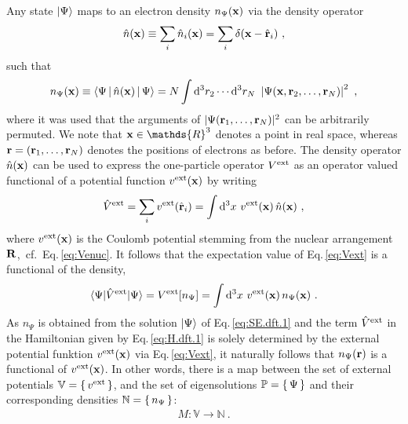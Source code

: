 Any state $\Ket{\Psi}$ maps to an electron density $n_\Psi ({\bf x})$ via the density operator
\begin{align}
	\hat n ({\bf x}) \equiv \sum_i \hat n_i ({\bf x}) = \sum_i \delta ({\bf x} - \hat{\bf r}_i)~,
	\label{eq:densop}
\end{align}
such that
\begin{align}
	n_\Psi({\bf x}) 
	\equiv \Braket{\Psi | \hat n({\bf x}) | \Psi} 
	= N \int {\rm d}^3 r_2 \cdots {\rm d}^3 r_{N} ~ 
	\left\lvert 
	\Psi ({\bf x}, {\bf r}_2, \ldots, {\bf r}_N) 
	\right\rvert^2~,
\end{align}
where it was used that the arguments of $\lvert \Psi ({\bf r}_1, \ldots, {\bf r}_N) \rvert^2$ can be arbitrarily permuted.
We note that ${\bf x} \in \mathds{R}^3$ denotes a point in real space, whereas ${\bf r} = ({\bf r}_1, \ldots, {\bf r}_N)$ denotes the positions of electrons as before.
The density operator $\hat n ({\bf x})$ can be used to express the one-particle operator $V^{\rm ext}$ as an operator valued functional of a potential function $v^{\rm ext} ({\bf x})$ by writing
\begin{align}
	\hat V^{\rm ext}
		= \sum_i v^{\rm ext} (\hat{\bf r}_i)
		= \int {\rm d}^3 x ~ v^{\rm ext} ({\bf x}) \, \hat n ({\bf x})~,
		\label{eq:Vext}
\end{align}
where $v^{\rm ext} ({\bf x})$ is the Coulomb potential stemming from the nuclear arrangement $\bf R$,~cf.~Eq.\,\eqref{eq:Venuc}.
It follows that the expectation value of Eq.\,\eqref{eq:Vext} is a functional of the density,
\begin{align}
	\braket{\Psi | \hat V^{\rm ext} | \Psi}
		= V^{\rm ext} [n_\Psi]
		= \int {\rm d}^3 x ~ v^{\rm ext} ({\bf x}) \, n_\Psi ({\bf x})~.
		\label{eq:dft.Vext.expectation}
\end{align}
As $n_\Psi$ is obtained from the solution $\Ket{\Psi}$ of Eq.\,\eqref{eq:SE.dft.1} and the term $\hat V^{\rm ext}$ in the Hamiltonian given by Eq.\,\eqref{eq:H.dft.1} is solely determined by the external potential funktion $v^{\rm ext} ({\bf x})$ via Eq.\,\eqref{eq:Vext}, it naturally follows that $n_\Psi ({\bf r})$ is a functional of $v^{\rm ext} ({\bf x})$. In other words, there is a map between the set of external potentials $\mathbb V = \set{v^{\rm ext}}$, and the set of eigensolutions $\mathbb P = \set{\Psi}$ and their corresponding densities $\mathbb N = \set{n_\Psi}$:
\begin{align}
	M: \mathbb V \rightarrow \mathbb N~.
	\label{eq:dft.map.1}
\end{align}

